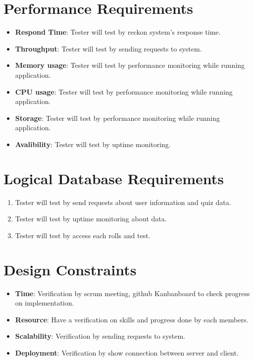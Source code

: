 \documentclass[ 10pt]{report}
\begin{document}
        \section{Performance Requirements}
        \begin{itemize}
            \item \textbf{Respond Time}: Tester will test by reckon system's response time.  
            \item \textbf{Throughput}: Tester will test by sending requests to system.
            \item \textbf{Memory usage}: Tester will test by performance monitoring while running application.
            \item \textbf{CPU usage}: Tester will test by performance monitoring while running application.
            \item \textbf{Storage}: Tester will test by performance monitoring while running application.
            \item \textbf{Avalibility}: Tester will test by uptime monitoring.
            \end{itemize}
        \section{Logical Database Requirements}
        \begin{enumerate}
            \item Tester will test by send requests about user information and quiz data.
            \item Tester will test by uptime monitoring about data.
            \item Tester will test by access each rolls and test.
        \end{enumerate}
        \section{Design Constraints}
        \begin{itemize}
            \item \textbf{Time}: Verification by scrum meeting, github Kanbanboard to check progress on implementation.
            \item \textbf{Resource}: Have a verification on skills and progress done by each members.
            \item \textbf{Scalability}: Verification by sending requests to system.
            \item \textbf{Deployment}: Verification by show connection between server and client.
        \end{itemize}
\end{document}
